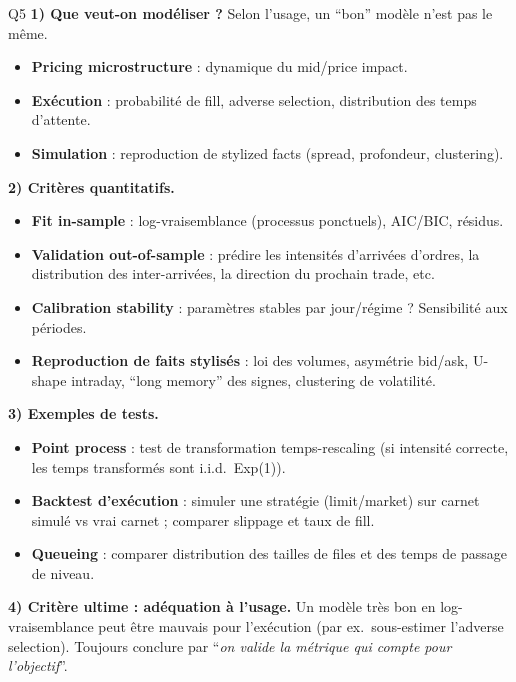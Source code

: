 \begin{solutionbox}{Q5}
\textbf{1) Que veut-on modéliser ?} Selon l'usage, un ``bon'' modèle n'est pas le même.
\begin{itemize}[leftmargin=*]
  \item \textbf{Pricing microstructure} : dynamique du mid/price impact.
  \item \textbf{Exécution} : probabilité de fill, adverse selection, distribution des temps d'attente.
  \item \textbf{Simulation} : reproduction de stylized facts (spread, profondeur, clustering).
\end{itemize}

\medskip
\textbf{2) Critères quantitatifs.}
\begin{itemize}[leftmargin=*]
  \item \textbf{Fit in-sample} : log-vraisemblance (processus ponctuels), AIC/BIC, résidus.
  \item \textbf{Validation out-of-sample} : prédire les intensités d'arrivées d'ordres, la distribution des inter-arrivées, la direction du prochain trade, etc.
  \item \textbf{Calibration stability} : paramètres stables par jour/régime ? Sensibilité aux périodes.
  \item \textbf{Reproduction de faits stylisés} : loi des volumes, asymétrie bid/ask, U-shape intraday, ``long memory'' des signes, clustering de volatilité.
\end{itemize}

\medskip
\textbf{3) Exemples de tests.}
\begin{itemize}[leftmargin=*]
  \item \textbf{Point process} : test de transformation temps-rescaling (si intensité correcte, les temps transformés sont i.i.d.\ Exp(1)).
  \item \textbf{Backtest d'exécution} : simuler une stratégie (limit/market) sur carnet simulé vs vrai carnet ; comparer slippage et taux de fill.
  \item \textbf{Queueing} : comparer distribution des tailles de files et des temps de passage de niveau.
\end{itemize}

\medskip
\textbf{4) Critère ultime : adéquation à l'usage.} Un modèle très bon en log-vraisemblance peut être mauvais pour l'exécution (par ex.\ sous-estimer l'adverse selection). Toujours conclure par ``\emph{on valide la métrique qui compte pour l'objectif}''.
\end{solutionbox}

